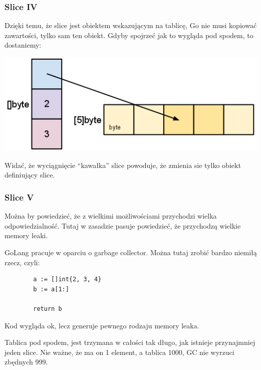 \documentclass[10pt]{beamer}
\newcommand{\quotes}[1]{``#1''}
\begin{document}
\begin{frame}[fragile]
    \frametitle{Slice IV}
    Dzięki temu, że slice jest obiektem wskazującym na tablicę, Go nie musi 
    kopiować zawartości, tylko sam ten obiekt. Gdyby spojrzeć jak to wygląda
    pod spodem, to dostaniemy:

    \begin{center}
        \includegraphics[scale=0.25]{slice-2.png}
    \end{center}

    Widać, że wyciągnięcie \quotes{kawałka} slice powoduje, że zmienia sie tylko
    obiekt definiujący slice.
\end{frame}

\begin{frame}[fragile]
    \frametitle{Slice V}
    Można by powiedzieć, że z wielkimi możliwościami przychodzi wielka odpowiedzialność.
    Tutaj w zasadzie pasuje powiedzieć, że przychodzą wielkie memory leaki.

    GoLang pracuje w oparciu o garbage collector. Można tutaj zrobić bardzo niemiłą rzecz,
    czyli:

    \begin{verbatim}
        a := []int{2, 3, 4}
        b := a[1:]

        return b
    \end{verbatim}

    Kod wygląda ok, lecz generuje pewnego rodzaju memory leaka.
    
    Tablica pod spodem, jest trzymana w całości tak długo, jak istnieje przynajmniej jeden
    slice. Nie ważne, że ma on 1 element, a tablica 1000, GC nie wyrzuci zbędnych 999.
\end{frame}
\end{document}
